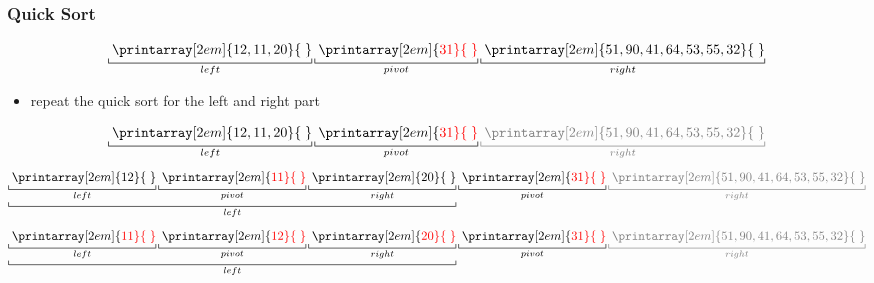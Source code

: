 \documentclass[newPxFont,sthlmFooter,nooffset]{beamer}
\begin{document}
\begin{frame}[t, fragile]
  \frametitle{Quick Sort}
\[
\underbracket[0.5pt]{{\thickspace}\printarray[2em]{12, 11, 20}{\thickspace}}_{left}
\underbracket[0.5pt]{{\thickspace}\printarray[2em]{\color{red}31}{\thickspace}}_{pivot}
\underbracket[0.5pt]{{\thickspace}\printarray[2em]{51, 90, 41, 64, 53, 55, 32}{\thickspace}}_{right}
\] 

\begin{itemize}
\item repeat the quick sort for the left and right part
\end{itemize}

\[
\underbracket[0.5pt]{{\thickspace}\printarray[2em]{12, 11, 20}{\thickspace}}_{left}
\underbracket[0.5pt]{{\thickspace}\printarray[2em]{\color{red}31}{\thickspace}}_{pivot}
\color{black!50}\underbracket[0.5pt]{{\thickspace}\printarray[2em]{51, 90, 41, 64, 53, 55, 32}{\thickspace}}_{right}
\] \pause
\[
\underbracket[0.5pt]{
\underbracket[0.5pt]{{\thickspace}\printarray[2em]{12}{\thickspace}}_{left} 
\underbracket[0.5pt]{{\thickspace}\printarray[2em]{\color{red}11}{\thickspace}}_{pivot}
\underbracket[0.5pt]{{\thickspace}\printarray[2em]{ 20}{\thickspace}}_{right}
}_{left}
\underbracket[0.5pt]{{\thickspace}\printarray[2em]{\color{red}31}{\thickspace}}_{pivot}
\color{black!50}\underbracket[0.5pt]{{\thickspace}\printarray[2em]{51, 90, 41, 64, 53, 55, 32}{\thickspace}}_{right}
\] \pause
\[
\underbracket[0.5pt]{
\underbracket[0.5pt]{{\thickspace}\printarray[2em]{\color{red}11}{\thickspace}}_{left} 
\underbracket[0.5pt]{{\thickspace}\printarray[2em]{\color{red}12}{\thickspace}}_{pivot}
\underbracket[0.5pt]{{\thickspace}\printarray[2em]{\color{red}20}{\thickspace}}_{right}
}_{left}
\underbracket[0.5pt]{{\thickspace}\printarray[2em]{\color{red}31}{\thickspace}}_{pivot}
\color{black!50}\underbracket[0.5pt]{{\thickspace}\printarray[2em]{51, 90, 41, 64, 53, 55, 32}{\thickspace}}_{right}
\] 



\end{frame}
\end{document}
